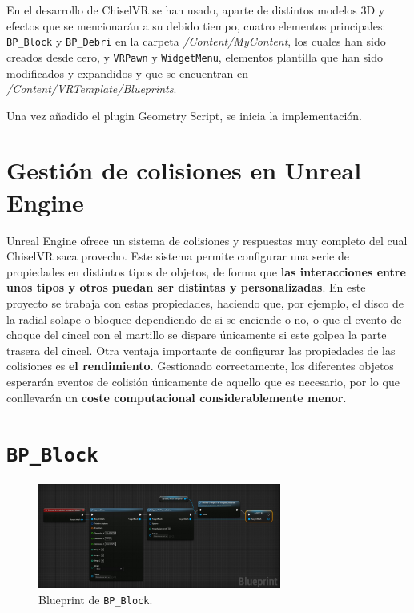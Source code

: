 En el desarrollo de ChiselVR se han usado, aparte de distintos modelos 3D y efectos que se mencionarán a su debido tiempo, cuatro elementos principales: \texttt{BP\_Block} y \texttt{BP\_Debri} en la carpeta \textit{/Content/MyContent}, los cuales han sido creados desde cero, y \texttt{VRPawn} y \texttt{WidgetMenu}, elementos plantilla que han sido modificados y expandidos y que se encuentran en \textit{/Content/VRTemplate/Blueprints}.

Una vez añadido el plugin Geometry Script, se inicia la implementación.

\section{Gestión de colisiones en Unreal Engine}

Unreal Engine ofrece un sistema de colisiones y respuestas muy completo del cual ChiselVR saca provecho. Este sistema permite configurar una serie de propiedades en distintos tipos de objetos, de forma que \textbf{las interacciones entre unos tipos y otros puedan ser distintas y personalizadas}. En este proyecto se trabaja con estas propiedades, haciendo que, por ejemplo, el disco de la radial solape o bloquee dependiendo de si se enciende o no, o que el evento de choque del cincel con el martillo se dispare únicamente si este golpea la parte trasera del cincel. Otra ventaja importante de configurar las propiedades de las colisiones es \textbf{el rendimiento}. Gestionado correctamente, los diferentes objetos esperarán eventos de colisión únicamente de aquello que es necesario, por lo que conllevarán un \textbf{coste computacional considerablemente menor}.

\section{\texttt{BP\_Block}}

\begin{figure}[H]
	\centering
	\includegraphics[width=8cm]{imagenes/bpblock}
	\caption{Blueprint de \texttt{BP\_Block}.}
	\label{fig:bpblock}
\end{figure}

